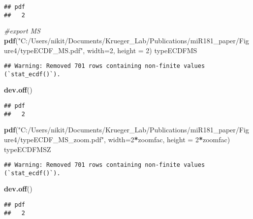\documentclass[
]{article}
\newenvironment{Shaded}{\begin{snugshade}}{\end{snugshade}}
\newcommand{\AttributeTok}[1]{\textcolor[rgb]{0.13,0.29,0.53}{#1}}
\newcommand{\CommentTok}[1]{\textcolor[rgb]{0.56,0.35,0.01}{\textit{#1}}}
\newcommand{\DecValTok}[1]{\textcolor[rgb]{0.00,0.00,0.81}{#1}}
\newcommand{\FunctionTok}[1]{\textcolor[rgb]{0.13,0.29,0.53}{\textbf{#1}}}
\newcommand{\NormalTok}[1]{#1}
\newcommand{\SpecialCharTok}[1]{\textcolor[rgb]{0.81,0.36,0.00}{\textbf{#1}}}
\newcommand{\StringTok}[1]{\textcolor[rgb]{0.31,0.60,0.02}{#1}}
\begin{document}
\begin{verbatim}
## pdf 
##   2
\end{verbatim}

\begin{Shaded}
\begin{Highlighting}[]
\CommentTok{\#export MS}
\FunctionTok{pdf}\NormalTok{(}\StringTok{"C:/Users/nikit/Documents/Krueger\_Lab/Publications/miR181\_paper/Figure4/typeECDF\_MS.pdf"}\NormalTok{, }\AttributeTok{width=}\DecValTok{2}\NormalTok{, }\AttributeTok{height =} \DecValTok{2}\NormalTok{)}
\NormalTok{typeECDFMS}
\end{Highlighting}
\end{Shaded}

\begin{verbatim}
## Warning: Removed 701 rows containing non-finite values (`stat_ecdf()`).
\end{verbatim}

\begin{Shaded}
\begin{Highlighting}[]
\FunctionTok{dev.off}\NormalTok{()}
\end{Highlighting}
\end{Shaded}

\begin{verbatim}
## pdf 
##   2
\end{verbatim}

\begin{Shaded}
\begin{Highlighting}[]
\FunctionTok{pdf}\NormalTok{(}\StringTok{"C:/Users/nikit/Documents/Krueger\_Lab/Publications/miR181\_paper/Figure4/typeECDF\_MS\_zoom.pdf"}\NormalTok{, }\AttributeTok{width=}\DecValTok{2}\SpecialCharTok{*}\NormalTok{zoomfac, }\AttributeTok{height =} \DecValTok{2}\SpecialCharTok{*}\NormalTok{zoomfac)}
\NormalTok{typeECDFMSZ}
\end{Highlighting}
\end{Shaded}

\begin{verbatim}
## Warning: Removed 701 rows containing non-finite values (`stat_ecdf()`).
\end{verbatim}

\begin{Shaded}
\begin{Highlighting}[]
\FunctionTok{dev.off}\NormalTok{()}
\end{Highlighting}
\end{Shaded}

\begin{verbatim}
## pdf 
##   2
\end{verbatim}
\end{document}
